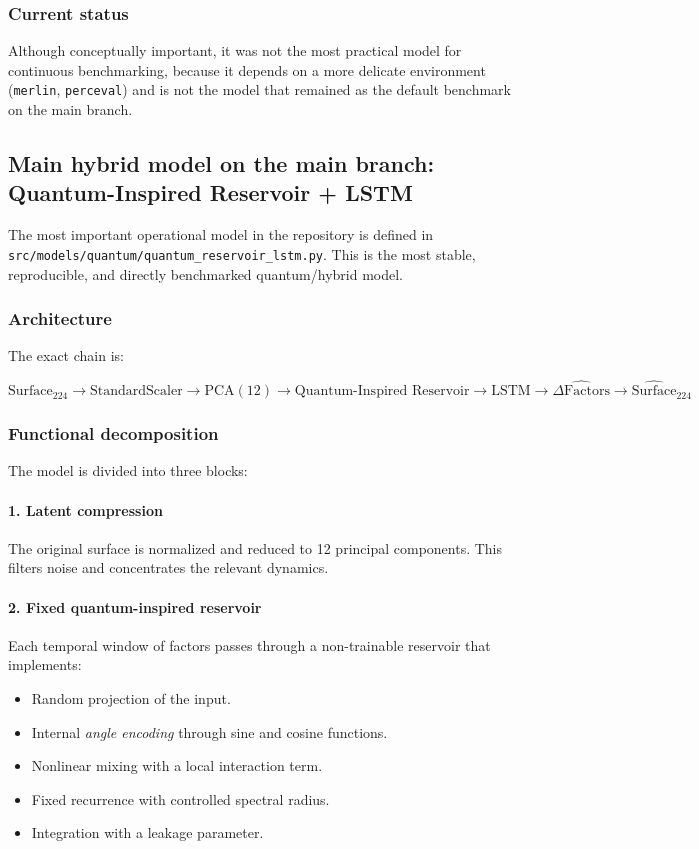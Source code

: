 \documentclass[11pt,a4paper]{article}
\newcommand{\Surface}{\ensuremath{\text{Surface}_{224}}}
\newcommand{\hSurface}{\ensuremath{\widehat{\text{Surface}}_{224}}}
\begin{document}
\subsubsection{Current status}
Although conceptually important, it was not the most practical model for continuous benchmarking, because it depends on a more delicate environment (\texttt{merlin}, \texttt{perceval}) and is not the model that remained as the default benchmark on the main branch.

\subsection{Main hybrid model on the main branch: Quantum-Inspired Reservoir + LSTM}

The most important operational model in the repository is defined in \texttt{src/models/quantum/quantum\_reservoir\_lstm.py}. This is the most stable, reproducible, and directly benchmarked quantum/hybrid model.

\subsubsection{Architecture}
The exact chain is:

\[
\Surface
\rightarrow
\text{StandardScaler}
\rightarrow
\text{PCA}(12)
\rightarrow
\text{Quantum-Inspired Reservoir}
\rightarrow
\text{LSTM}
\rightarrow
\widehat{\Delta \text{Factors}}
\rightarrow
\hSurface
\]

\subsubsection{Functional decomposition}
The model is divided into three blocks:

\paragraph{1. Latent compression}
The original surface is normalized and reduced to 12 principal components. This filters noise and concentrates the relevant dynamics.

\paragraph{2. Fixed quantum-inspired reservoir}
Each temporal window of factors passes through a non-trainable reservoir that implements:

\begin{itemize}
    \item Random projection of the input.
    \item Internal \textit{angle encoding} through sine and cosine functions.
    \item Nonlinear mixing with a local interaction term.
    \item Fixed recurrence with controlled spectral radius.
    \item Integration with a leakage parameter.
\end{itemize}
\end{document}
